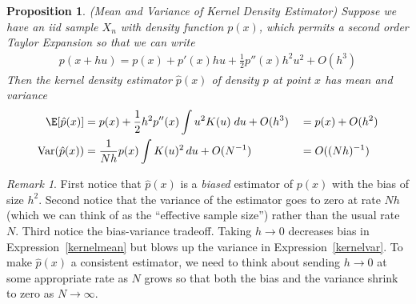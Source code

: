 \documentclass[12pt]{article}
\theoremstyle{plain}
\newtheorem{prop}[thm]{Proposition}
\theoremstyle{definition}
\theoremstyle{remark}
\newtheorem*{rmk}{Remark}
\newcommand{\ra}{\rightarrow}
\newcommand{\Var}{\operatorname{Var}}
\begin{document}
\begin{prop}\emph{(Mean and Variance of Kernel Density Estimator)}
Suppose we have an iid sample $X_n$ with density function $p(x)$, which
permits a second order Taylor Expansion so that we can write
\begin{align}
  p(x+hu)
  =
  p(x)
  + p'(x) hu
  + \frac{1}{2}p''(x)h^2u^2
  + O(h^3)
  \label{kerneltaylor1}
\end{align}
Then the kernel density estimator $\hat{p}(x)$ of density $p$ at point
$x$ has mean and variance
\begin{alignat}{3}
  \E[\hat{p}(x)]
  &=
  p(x)
  +
  \frac{1}{2}
  h^2
  p''(x)
  \int
  u^2
  K(u)
  \;du
  + O(h^3)
  &&=
  p(x) + O(h^2)
  \label{kernelmean}
  \\
  \Var(\hat{p}(x))
  &=
  \frac{1}{Nh}
  p(x)
  \int
  K(u)^2
  \,
  du
  + O(N^{-1})
  &&=
  O((Nh)^{-1})
  \label{kernelvar}
\end{alignat}
\end{prop}
\begin{rmk}
First notice that $\hat{p}(x)$ is a \emph{biased} estimator of $p(x)$
with the bias of size $h^2$.
Second notice that the variance of the estimator goes to zero at rate
$Nh$ (which we can think of as the ``effective sample size'') rather
than the usual rate $N$.
Third notice the bias-variance tradeoff.
Taking $h\ra 0$ decreases bias in Expression~\ref{kernelmean} but
blows up the variance in Expression~\ref{kernelvar}.
To make $\hat{p}(x)$ a consistent estimator, we need to think about
sending $h\ra 0$ at some appropriate rate as $N$ grows so that both the
bias and the variance shrink to zero as $N\ra\infty$.
\end{rmk}
\end{document}

